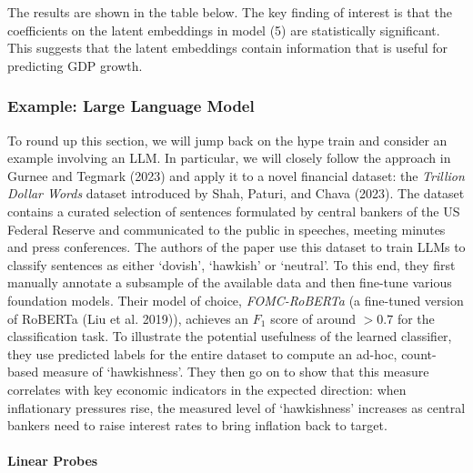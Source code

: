 \documentclass{article}
\theoremstyle{plain}
\theoremstyle{definition}
\theoremstyle{remark}
\begin{document}
The results are shown in the table below. The key finding of interest is
that the coefficients on the latent embeddings in model (5) are
statistically significant. This suggests that the latent embeddings
contain information that is useful for predicting GDP growth.



\subsubsection{Example: Large Language Model}\label{ex-llm}

To round up this section, we will jump back on the hype train and
consider an example involving an LLM. In particular, we will closely
follow the approach in Gurnee and Tegmark (2023) and apply it to a novel
financial dataset: the \emph{Trillion Dollar Words} dataset introduced
by Shah, Paturi, and Chava (2023). The dataset contains a curated
selection of sentences formulated by central bankers of the US Federal
Reserve and communicated to the public in speeches, meeting minutes and
press conferences. The authors of the paper use this dataset to train
LLMs to classify sentences as either `dovish', `hawkish' or `neutral'.
To this end, they first manually annotate a subsample of the available
data and then fine-tune various foundation models. Their model of
choice, \emph{FOMC-RoBERTa} (a fine-tuned version of RoBERTa (Liu et al.
2019)), achieves an \(F_1\) score of around \(>0.7\) for the
classification task. To illustrate the potential usefulness of the
learned classifier, they use predicted labels for the entire dataset to
compute an ad-hoc, count-based measure of `hawkishness'. They then go on
to show that this measure correlates with key economic indicators in the
expected direction: when inflationary pressures rise, the measured level
of `hawkishness' increases as central bankers need to raise interest
rates to bring inflation back to target.

\paragraph{Linear Probes}\label{linear-probes}
\end{document}
